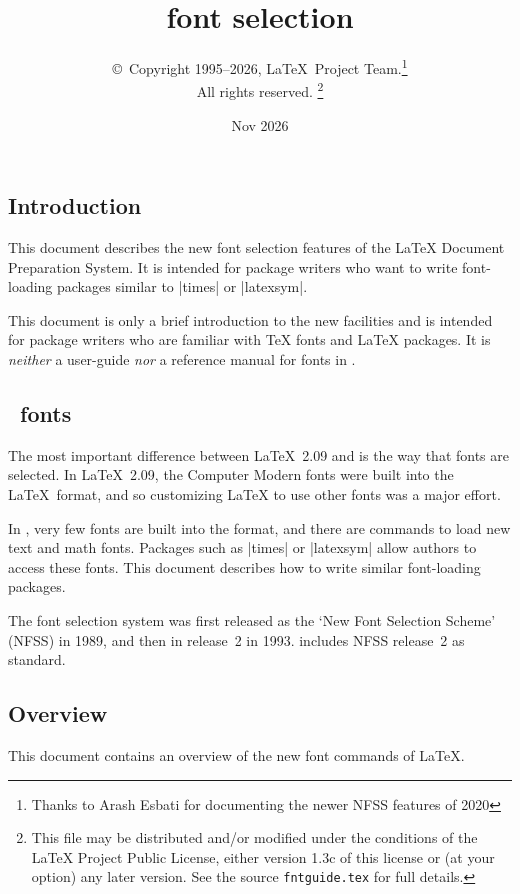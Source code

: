 \documentclass{ltxguide}[1995/11/28]
\title{\LaTeXe{} font selection}
\author{\copyright~Copyright 1995--2026, \LaTeX\ Project
  Team.\thanks{Thanks to Arash Esbati for documenting the
    newer NFSS features of 2020}\\
  All rights reserved.%
  \footnote{This file may be distributed and/or modified under the
    conditions of the \LaTeX{} Project Public License, either version 1.3c
    of this license or (at your option) any later version. See the source
   \texttt{fntguide.tex} for full details.}%
}
\date{Nov 2026}
\begin{document}
\maketitle

\tableofcontents

\subsection{Introduction}

This document describes the new font selection features of the \LaTeX{}
Document Preparation System.  It is intended for package writers who
want to write font-loading packages similar to |times| or |latexsym|.

This document is only a brief introduction to the new facilities and is
intended for package writers who are familiar with \TeX{} fonts and
\LaTeX{} packages.  It is \emph{neither} a user-guide \emph{nor} a
reference manual for fonts in \LaTeXe.

\subsection{\LaTeXe~fonts}

The most important difference between \LaTeX~2.09 and \LaTeXe{} is the
way that fonts are selected.  In \LaTeX~2.09, the Computer Modern fonts
were built into the \LaTeX~format, and so customizing \LaTeX{} to use
other fonts was a major effort.

In \LaTeXe, very few fonts are built into the format, and there are
commands to load new text and math fonts.  Packages such as |times| or
|latexsym| allow authors to access these fonts.  This document describes
how to write similar font-loading packages.

The \LaTeXe{} font selection system was first released as the `New Font
Selection Scheme' (NFSS) in 1989, and then in release~2 in 1993.
\LaTeXe{} includes NFSS release~2 as standard.

\subsection{Overview}

This document contains an overview of the new font commands of \LaTeX.
\end{document}
